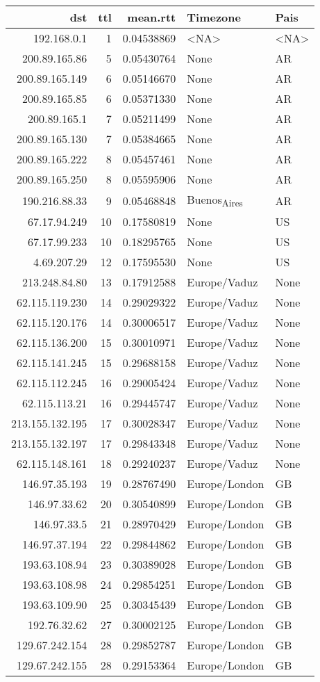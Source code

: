 \documentclass[11pt]{article}
\author{nsm}
\date{\today}
\title{}
\begin{document}
\tableofcontents

\begin{center}
\begin{tabular}{rrrll}
dst & ttl & mean.rtt & Timezone & Pais\\
\hline
192.168.0.1 & 1 & 0.04538869 & <NA> & <NA>\\
200.89.165.86 & 5 & 0.05430764 & None & AR\\
200.89.165.149 & 6 & 0.05146670 & None & AR\\
200.89.165.85 & 6 & 0.05371330 & None & AR\\
200.89.165.1 & 7 & 0.05211499 & None & AR\\
200.89.165.130 & 7 & 0.05384665 & None & AR\\
200.89.165.222 & 8 & 0.05457461 & None & AR\\
200.89.165.250 & 8 & 0.05595906 & None & AR\\
190.216.88.33 & 9 & 0.05468848 & Buenos\textsubscript{Aires} & AR\\
67.17.94.249 & 10 & 0.17580819 & None & US\\
67.17.99.233 & 10 & 0.18295765 & None & US\\
4.69.207.29 & 12 & 0.17595530 & None & US\\
213.248.84.80 & 13 & 0.17912588 & Europe/Vaduz & None\\
62.115.119.230 & 14 & 0.29029322 & Europe/Vaduz & None\\
62.115.120.176 & 14 & 0.30006517 & Europe/Vaduz & None\\
62.115.136.200 & 15 & 0.30010971 & Europe/Vaduz & None\\
62.115.141.245 & 15 & 0.29688158 & Europe/Vaduz & None\\
62.115.112.245 & 16 & 0.29005424 & Europe/Vaduz & None\\
62.115.113.21 & 16 & 0.29445747 & Europe/Vaduz & None\\
213.155.132.195 & 17 & 0.30028347 & Europe/Vaduz & None\\
213.155.132.197 & 17 & 0.29843348 & Europe/Vaduz & None\\
62.115.148.161 & 18 & 0.29240237 & Europe/Vaduz & None\\
146.97.35.193 & 19 & 0.28767490 & Europe/London & GB\\
146.97.33.62 & 20 & 0.30540899 & Europe/London & GB\\
146.97.33.5 & 21 & 0.28970429 & Europe/London & GB\\
146.97.37.194 & 22 & 0.29844862 & Europe/London & GB\\
193.63.108.94 & 23 & 0.30389028 & Europe/London & GB\\
193.63.108.98 & 24 & 0.29854251 & Europe/London & GB\\
193.63.109.90 & 25 & 0.30345439 & Europe/London & GB\\
192.76.32.62 & 27 & 0.30002125 & Europe/London & GB\\
129.67.242.154 & 28 & 0.29852787 & Europe/London & GB\\
129.67.242.155 & 28 & 0.29153364 & Europe/London & GB\\
\end{tabular}
\end{center}
\end{document}
